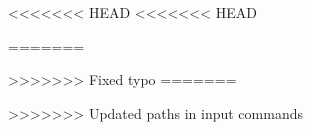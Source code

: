 <<<<<<< HEAD
<<<<<<< HEAD

=======

>>>>>>> Fixed typo
=======

>>>>>>> Updated paths in input commands
